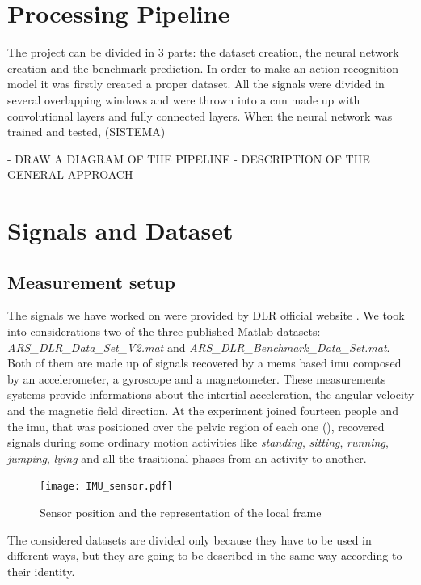 
\section{Processing Pipeline}
\label{sec:processing_architecture}
The project can be divided in 3 parts: the dataset creation, the neural network creation and the benchmark prediction.
In order to make an action recognition model it was firstly created a proper dataset. All the signals were divided in several overlapping windows and were thrown into a \gls{cnn} made up with convolutional layers and fully connected layers.
When the neural network was trained and tested, (SISTEMA)

- DRAW A DIAGRAM OF THE PIPELINE
- DESCRIPTION OF THE GENERAL APPROACH

\section{Signals and Dataset}
\label{sec:model}

\subsection{Measurement setup}
The signals we have worked on were provided by DLR official website \cite{DLR}. We took into considerations two of the three published Matlab datasets: \textit{ARS\_DLR\_Data\_Set\_V2.mat} and \textit{ARS\_DLR\_Benchmark\_Data\_Set.mat}. 
Both of them are made up of signals recovered by a \gls{mems} based \gls{imu} composed by an accelerometer, a gyroscope and a magnetometer. These measurements systems provide informations about the intertial acceleration, the angular velocity and the magnetic field direction.
At the experiment joined fourteen people and the \gls{imu}, that was positioned over the pelvic region of each one (), recovered signals during some ordinary motion activities like \textit{standing}, \textit{sitting}, \textit{running}, \textit{jumping}, \textit{lying} and all the trasitional phases from an activity to another.

\begin{figure}
\texttt{[image: IMU\_sensor.pdf]}
\caption{Sensor position and the representation of the local frame}
\label{fig:IMU}
\end{figure}

The considered datasets are divided only because they have to be used in different ways, but they are going to be described in the same way according to their identity.

